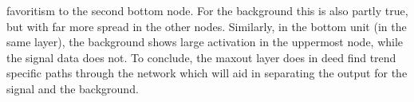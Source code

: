 favoritism to the second bottom node. For the background this is also partly true, but with far more 
spread in the other nodes. Similarly, in the bottom unit (in the same layer), the background shows large
activation in the uppermost node, while the signal data does not. To conclude, the maxout layer does in deed 
find trend specific paths through the network which will aid in separating the output for the signal and the background.\\
\begin{figure}
\end{figure}

